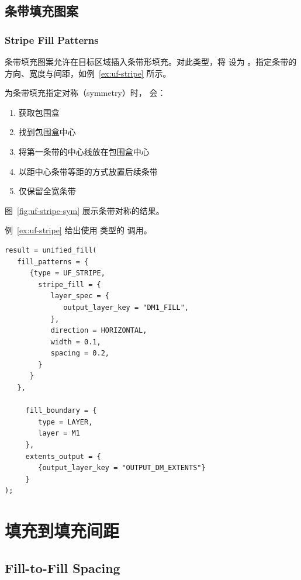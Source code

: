 \subsection{条带填充图案}
\subsubsection*{Stripe Fill Patterns}

条带填充图案允许在目标区域插入条带形填充。对此类型，将  设为 。指定条带的方向、宽度与间距，如例~\ref{ex:uf-stripe} 所示。


为条带填充指定对称（symmetry）时， 会：
\begin{enumerate}
  \item 获取包围盒
  \item 找到包围盒中心
  \item 将第一条带的中心线放在包围盒中心
  \item 以距中心条带等距的方式放置后续条带
  \item 仅保留全宽条带
\end{enumerate}

图~\ref{fig:uf-stripe-sym} 展示条带对称的结果。


例~\ref{ex:uf-stripe} 给出使用  类型的  调用。

\begin{lstlisting}[style=pxl,caption={UF\_STRIPE 类型示例},label={ex:uf-stripe}]
result = unified_fill(
   fill_patterns = {
      {type = UF_STRIPE,
        stripe_fill = {
           layer_spec = {
              output_layer_key = "DM1_FILL",
           },
           direction = HORIZONTAL,
           width = 0.1,
           spacing = 0.2,
        }
      }
   },

     fill_boundary = {
        type = LAYER,
        layer = M1
     },
     extents_output = {
        {output_layer_key = "OUTPUT_DM_EXTENTS"}
     }
);
\end{lstlisting}

\section{填充到填充间距}
\subsection*{Fill-to-Fill Spacing}

